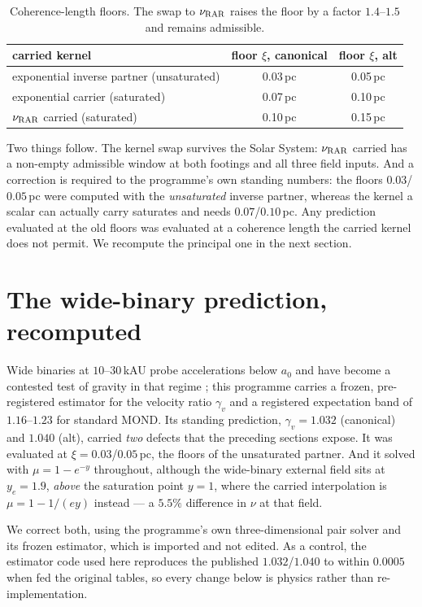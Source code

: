 \documentclass[11pt,letterpaper]{article}
\begin{document}
\begin{table}[h]\centering
\begin{tabular}{lcc}\toprule
carried kernel & floor $\xi$, canonical & floor $\xi$, alt\\\midrule
exponential inverse partner (unsaturated) & 0.03\,pc & 0.05\,pc\\
exponential carrier (saturated) & 0.07\,pc & 0.10\,pc\\
$\nu_{\rm RAR}$ carried (saturated) & 0.10\,pc & 0.15\,pc\\\bottomrule
\end{tabular}
\caption{Coherence-length floors. The swap to $\nu_{\rm RAR}$ raises the floor by a factor $1.4$--$1.5$ and remains admissible.}\label{tab:xi}
\end{table}

Two things follow. The kernel swap survives the Solar System: $\nu_{\rm RAR}$ carried has a non-empty admissible window at both footings and all three field inputs. And a correction is required to the programme's own standing numbers: the floors $0.03$/$0.05$\,pc were computed with the \emph{unsaturated} inverse partner, whereas the kernel a scalar can actually carry saturates and needs $0.07$/$0.10$\,pc. Any prediction evaluated at the old floors was evaluated at a coherence length the carried kernel does not permit. We recompute the principal one in the next section.

\section{The wide-binary prediction, recomputed}
Wide binaries at $10$--$30$\,kAU probe accelerations below $a_0$ and have become a contested test of gravity in that regime \cite{chae23,banik24}; this programme carries a frozen, pre-registered estimator for the velocity ratio $\gamma_v$ and a registered expectation band of $1.16$--$1.23$ for standard MOND. Its standing prediction, $\gamma_v=1.032$ (canonical) and $1.040$ (alt), carried \emph{two} defects that the preceding sections expose. It was evaluated at $\xi=0.03$/$0.05$\,pc, the floors of the unsaturated partner. And it solved with $\mu=1-e^{-y}$ throughout, although the wide-binary external field sits at $y_e=1.9$, \emph{above} the saturation point $y=1$, where the carried interpolation is $\mu=1-1/(ey)$ instead --- a $5.5\%$ difference in $\nu$ at that field.

We correct both, using the programme's own three-dimensional pair solver and its frozen estimator, which is imported and not edited. As a control, the estimator code used here reproduces the published $1.032$/$1.040$ to within $0.0005$ when fed the original tables, so every change below is physics rather than re-implementation.
\end{document}
